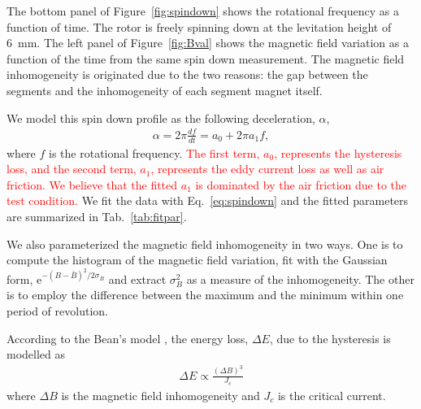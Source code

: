 \documentclass[journal]{IEEEtran}
\def\cred{\textcolor{red}}
\begin{document}
The bottom panel of Figure~\ref{fig:spindown} shows the rotational frequency as a function of time.
The rotor is freely spinning down at the levitation height of 6~mm.
The left panel of Figure~\ref{fig:Bval} shows the magnetic field variation as a function of the time from the same spin down measurement.
The magnetic field inhomogeneity is originated due to the two reasons: the gap between the segments and the inhomogeneity of each segment magnet itself.

We model this spin down profile as the following deceleration, $\alpha$,
\begin{eqnarray}
\alpha = 2\pi \frac{df}{dt} = a_0 + 2\pi a_1 f,
\label{eq:spindown}
\end{eqnarray}
where $f$ is the rotational frequency\cite{hull_review}.
\cred{The first term, $a_0$, represents the hysteresis loss, and the second term, $a_1$, represents the eddy current loss as well as air friction.
We believe that the fitted $a_1$ is dominated by the air friction due to the test condition.}
We fit the data with Eq.~\ref{eq:spindown} and the fitted parameters are summarized in Tab.~\ref{tab:fitpar}.

We also parameterized the magnetic field inhomogeneity in two ways.
One is to compute the histogram of the magnetic field variation, fit with the Gaussian form, e$^{-(B-\bar{B})^2/2\sigma_B}$ and extract $\sigma_B^2$ as a measure of the inhomogeneity.
The other is to employ the difference between the maximum and the minimum within one period of revolution.

According to the Bean's model \cred{\cite{beans_model_1,beans_model_2}}, the energy loss, $\Delta E$, due to the hysteresis is modelled as
\begin{eqnarray}
\Delta E \propto \frac{(\Delta B)^3}{J_c}
\label{eq:bean}
\end{eqnarray}
where $\Delta B$ is the magnetic field inhomogeneity and $J_c$ is the critical current.
\end{document}
